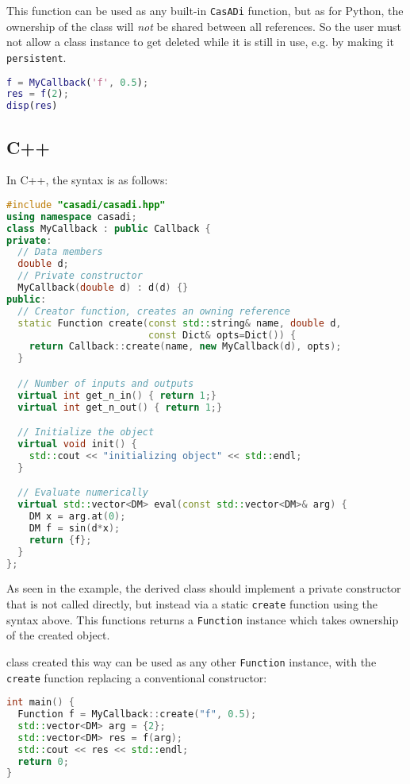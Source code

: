 \documentclass[a4paper,12pt]{book}
\newcommand{\CasADi}{\texttt{CasADi}\xspace}
\begin{document}
This function can be used as any built-in \CasADi function, but as for Python,
the ownership of the class will \emph{not} be shared between all references.
So the user must not allow a class instance to get deleted while it is still
in use, e.g. by making it \texttt{persistent}.

\begin{lstlisting}[language=Matlab]
% Use the function
f = MyCallback('f', 0.5);
res = f(2);
disp(res)
\end{lstlisting}

\subsection*{C++}
In C++, the syntax is as follows:
\begin{lstlisting}[language=C++]
#include "casadi/casadi.hpp"
using namespace casadi;
class MyCallback : public Callback {
private:
  // Data members
  double d;
  // Private constructor
  MyCallback(double d) : d(d) {}
public:
  // Creator function, creates an owning reference
  static Function create(const std::string& name, double d,
                         const Dict& opts=Dict()) {
    return Callback::create(name, new MyCallback(d), opts);
  }

  // Number of inputs and outputs
  virtual int get_n_in() { return 1;}
  virtual int get_n_out() { return 1;}

  // Initialize the object
  virtual void init() {
    std::cout << "initializing object" << std::endl;
  }

  // Evaluate numerically
  virtual std::vector<DM> eval(const std::vector<DM>& arg) {
    DM x = arg.at(0);
    DM f = sin(d*x);
    return {f};
  }
};
\end{lstlisting}

As seen in the example, the derived class should implement a private
constructor that is not called directly, but instead via a static \texttt{create}
function using the syntax above.
This functions returns a \texttt{Function} instance which takes ownership of the
created object.

 class created this way can be used as any other \texttt{Function} instance,
with the \texttt{create} function replacing a conventional constructor:

\begin{lstlisting}[language=C++]
int main() {
  Function f = MyCallback::create("f", 0.5);
  std::vector<DM> arg = {2};
  std::vector<DM> res = f(arg);
  std::cout << res << std::endl;
  return 0;
}
\end{lstlisting}
\end{document}
